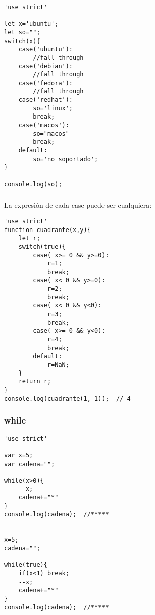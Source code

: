 \documentclass[ucs]{beamer}
\begin{document}
\begin{frame}[fragile]
\frametitle{}

  \begin{scriptsize}
  \begin{verbatim}
'use strict'

let x='ubuntu';
let so="";
switch(x){
    case('ubuntu'):
        //fall through
    case('debian'):
        //fall through
    case('fedora'):
        //fall through
    case('redhat'):
        so='linux';
        break;
    case('macos'):
        so="macos"
        break;
    default:
        so='no soportado';
}

console.log(so);
  \end{verbatim}
  \end{scriptsize}

\end{frame}



\begin{frame}[fragile]
\frametitle{}
La expresión de cada case puede ser cualquiera:

  \begin{scriptsize}
  \begin{verbatim}
'use strict'
function cuadrante(x,y){
    let r;
    switch(true){
        case( x>= 0 && y>=0):
            r=1;
            break;
        case( x< 0 && y>=0):
            r=2;
            break;
        case( x< 0 && y<0):
            r=3;
            break;
        case( x>= 0 && y<0):
            r=4;
            break;
        default:
            r=NaN;
    }
    return r;
}
console.log(cuadrante(1,-1));  // 4
  \end{verbatim}
  \end{scriptsize}

\end{frame}




\begin{frame}[fragile]
\frametitle{while}

  \begin{scriptsize}
  \begin{verbatim}
'use strict'

var x=5;
var cadena="";

while(x>0){
    --x;
    cadena+="*"
}
console.log(cadena);  //*****


x=5;
cadena="";

while(true){
    if(x<1) break;
    --x;
    cadena+="*"
}
console.log(cadena);  //*****
  \end{verbatim}
  \end{scriptsize}

\end{frame}
\end{document}
